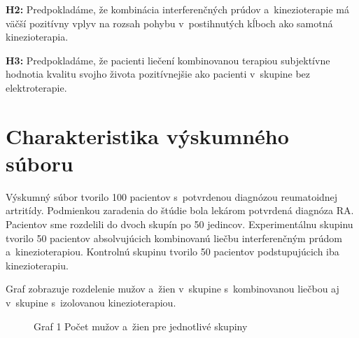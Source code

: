 \textbf{H2:} Predpokladáme, že kombinácia interferenčných prúdov a~kinezioterapie má väčší pozitívny vplyv na rozsah pohybu v~postihnutých kĺboch ako samotná kinezioterapia.

\textbf{H3:} Predpokladáme, že pacienti liečení kombinovanou terapiou subjektívne hodnotia kvalitu svojho života pozitívnejšie ako pacienti v~skupine bez elektroterapie.


\section{Charakteristika výskumného súboru}

Výskumný súbor tvorilo 100 pacientov s~potvrdenou diagnózou reumatoidnej artritídy. Podmienkou zaradenia do štúdie bola lekárom potvrdená diagnóza RA. Pacientov sme rozdelili do dvoch skupín po 50 jedincov. Experimentálnu skupinu tvorilo 50 pacientov absolvujúcich kombinovanú liečbu interferenčným prúdom a~kinezioterapiou. Kontrolnú skupinu tvorilo 50 pacientov podstupujúcich iba kinezioterapiu.

Graf zobrazuje rozdelenie mužov a~žien v~skupine s~kombinovanou liečbou aj v~skupine s~izolovanou kinezioterapiou.


\begin{figure}[H]
    \centering
    \caption*{Graf 1 Počet mužov a~žien pre jednotlivé skupiny}
    \label{fig:zastupenie_pohlavie}
\end{figure}

